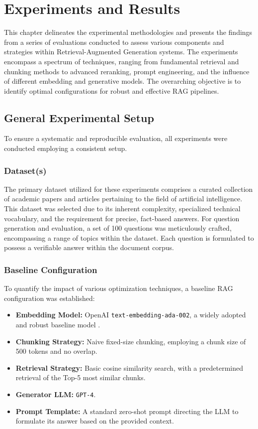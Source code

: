 \chapter{Experiments and Results}
\label{chap:experiments_results}

This chapter delineates the experimental methodologies and presents the findings from a series of evaluations conducted to assess various components and strategies within Retrieval-Augmented Generation systems. The experiments encompass a spectrum of techniques, ranging from fundamental retrieval and chunking methods to advanced reranking, prompt engineering, and the influence of different embedding and generative models. The overarching objective is to identify optimal configurations for robust and effective RAG pipelines.

\section{General Experimental Setup}
\label{sec:general_setup}
To ensure a systematic and reproducible evaluation, all experiments were conducted employing a consistent setup.

\subsection{Dataset(s)}
The primary dataset utilized for these experiments comprises a curated collection of academic papers and articles pertaining to the field of artificial intelligence. This dataset was selected due to its inherent complexity, specialized technical vocabulary, and the requirement for precise, fact-based answers. For question generation and evaluation, a set of 100 questions was meticulously crafted, encompassing a range of topics within the dataset. Each question is formulated to possess a verifiable answer within the document corpus.

\subsection{Baseline Configuration}
To quantify the impact of various optimization techniques, a baseline RAG configuration was established:
\begin{itemize}
    \item \textbf{Embedding Model:} OpenAI \texttt{text-embedding-ada-002}, a widely adopted and robust baseline model \autocite{openai2022ada002}.
    \item \textbf{Chunking Strategy:} Naive fixed-size chunking, employing a chunk size of 500 tokens and no overlap.
    \item \textbf{Retrieval Strategy:} Basic cosine similarity search, with a predetermined retrieval of the Top-5 most similar chunks.
    \item \textbf{Generator LLM:} \texttt{GPT-4}.
    \item \textbf{Prompt Template:} A standard zero-shot prompt directing the LLM to formulate its answer based on the provided context.
\end{itemize}

